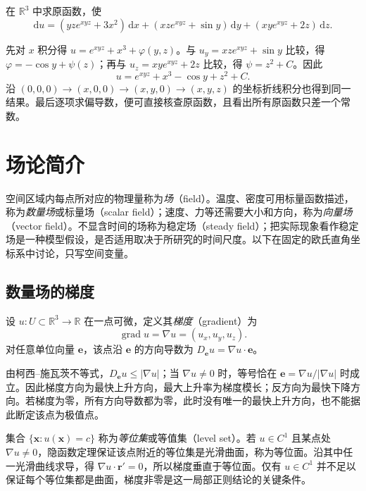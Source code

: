 \documentclass[UTF8,12pt,a4paper,fontset=fandol]{ctexbook}
\begin{document}
\begin{example}
\label{ex:potential-exponential-polynomial}
在 $\mathbb R^3$ 中求原函数，使
\[
    \mathrm du=(yze^{xyz}+3x^2)\,\mathrm dx
      +(xze^{xyz}+\sin y)\,\mathrm dy
      +(xye^{xyz}+2z)\,\mathrm dz.
\]
\end{example}
\begin{solve}
先对 $x$ 积分得 $u=e^{xyz}+x^3+\varphi(y,z)$。与 $u_y=xze^{xyz}+\sin y$ 比较，得 $\varphi=-\cos y+\psi(z)$；再与 $u_z=xye^{xyz}+2z$ 比较，得 $\psi=z^2+C$。因此
\[
    u=e^{xyz}+x^3-\cos y+z^2+C.
\]
沿 $(0,0,0)\to(x,0,0)\to(x,y,0)\to(x,y,z)$ 的坐标折线积分也得到同一结果。最后逐项求偏导数，便可直接核查原函数，且看出所有原函数只差一个常数。
\end{solve}

\section{场论简介}
\label{sec:introduction-to-field-theory}

空间区域内每点所对应的物理量称为\emph{场}（field）。温度、密度可用标量函数描述，称为\emph{数量场}或标量场（scalar field）；速度、力等还需要大小和方向，称为\emph{向量场}（vector field）。不显含时间的场称为稳定场（steady field）；把实际现象看作稳定场是一种模型假设，是否适用取决于所研究的时间尺度。以下在固定的欧氏直角坐标系中讨论，只写空间变量。

\subsection{数量场的梯度}
\label{subsec:gradient-of-scalar-fields}

\begin{definition}
\label{def:scalar-field-gradient}
设 $u:U\subset\mathbb R^3\to\mathbb R$ 在一点可微，定义其\emph{梯度}（gradient）为
\[
    \operatorname{grad}u=\nabla u=(u_x,u_y,u_z).
\]
对任意单位向量 $\boldsymbol e$，该点沿 $\boldsymbol e$ 的方向导数为 $D_{\boldsymbol e}u=\nabla u\cdot\boldsymbol e$。
\end{definition}

由柯西--施瓦茨不等式，$D_{\boldsymbol e}u\leq|\nabla u|$；当 $\nabla u\neq0$ 时，等号恰在 $\boldsymbol e=\nabla u/|\nabla u|$ 时成立。因此梯度方向为最快上升方向，最大上升率为梯度模长；反方向为最快下降方向。若梯度为零，所有方向导数都为零，此时没有唯一的最快上升方向，也不能据此断定该点为极值点。

集合 $\{\boldsymbol x:u(\boldsymbol x)=c\}$ 称为\emph{等位集}或等值集（level set）。若 $u\in C^1$ 且某点处 $\nabla u\neq0$，隐函数定理保证该点附近的等位集是光滑曲面，称为等位面。沿其中任一光滑曲线求导，得 $\nabla u\cdot\boldsymbol r'=0$，所以梯度垂直于等位面。仅有 $u\in C^1$ 并不足以保证每个等位集都是曲面，梯度非零是这一局部正则结论的关键条件。
\end{document}
